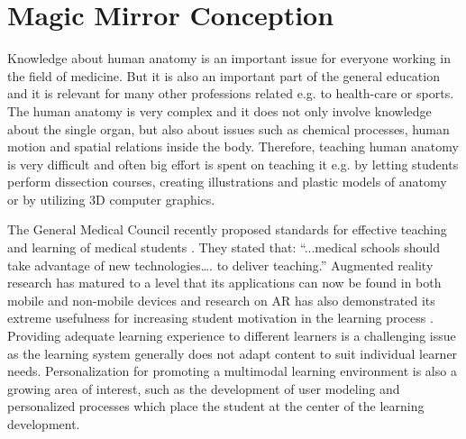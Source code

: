 \section{Magic Mirror Conception}
Knowledge about human anatomy is an important issue for everyone working in the field of medicine. But it is also an important part of the general education and it is relevant for many other professions related e.g. to health-care or sports. The human anatomy is very complex and it does not only involve knowledge about the single organ, but also about issues such as chemical processes, human motion and spatial relations inside the body. Therefore, teaching human anatomy is very difficult and often big effort is spent on teaching it e.g. by letting students perform dissection courses, creating illustrations and plastic models of anatomy or by utilizing 3D computer graphics.

The General Medical Council recently proposed standards for effective teaching and learning of medical students \cite{Council2009}. They stated that: ``...medical schools should take advantage of new technologies…. to deliver teaching.'' Augmented reality research has matured to a level that its applications can now be found in both mobile and non-mobile devices \cite{Bacca2014} and research on AR has also demonstrated its extreme usefulness for increasing student motivation in the learning process \cite{Chang2014,DiSerio2013}. Providing adequate learning experience to different learners is a challenging issue as the learning system generally does not adapt content to suit individual learner needs. Personalization for promoting a multimodal learning environment is also a growing area of interest, such as the development of user modeling and personalized processes which place the student at the center of the learning development.
